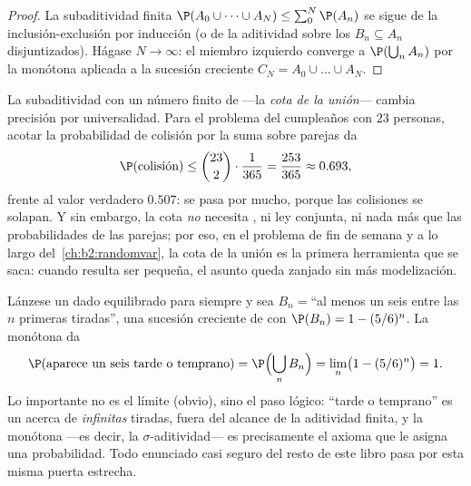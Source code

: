 \begin{proof}
La subaditividad finita $\P(A_0 \cup \dots \cup A_N) \leq \sum_0^N
\P(A_n)$ se sigue de la inclusión-exclusión por inducción (o de la
aditividad sobre los $B_n \subseteq A_n$ disjuntizados). Hágase $N
\to \infty$: el miembro izquierdo converge a $\P(\bigcup_n A_n)$ por
la  monótona aplicada a la sucesión creciente $C_N = A_0
\cup \dots \cup A_N$.
\end{proof}

\begin{example}\label{ex:b2:proba:unionbound}
La subaditividad con un número finito de  ---la \emph{cota de
la unión}--- cambia precisión por universalidad. Para el problema del
cumpleaños con $23$ personas, acotar la probabilidad de colisión por
la suma sobre parejas da
\[
\P(\text{colisión}) \leq \binom{23}2\cdot\frac1{365}
= \frac{253}{365} \approx 0.693 ,
\]
frente al valor verdadero $0.507$: se pasa por mucho, porque las
colisiones se solapan. Y sin embargo, la cota \emph{no} necesita
, ni ley conjunta, ni nada más que las probabilidades
de las parejas; por eso, en el problema de fin de semana y a lo largo
del~\cref{ch:b2:randomvar}, la cota de la unión es la primera
herramienta que se saca: cuando resulta ser pequeña, el asunto queda
zanjado sin más modelización.
\end{example}

\begin{example}\label{ex:b2:proba:sixeventually}
Lánzese un dado equilibrado para siempre y sea $B_n = {}$``al menos
un seis entre las $n$ primeras tiradas'', una sucesión creciente de
 con $\P(B_n) = 1 - (5/6)^n$. La  monótona da
\[
\P(\text{aparece un seis tarde o temprano})
= \P\Bigl(\bigcup_nB_n\Bigr)
= \lim_n\bigl(1 - (5/6)^n\bigr) = 1 .
\]
Lo importante no es el límite (obvio), sino el paso lógico: ``tarde o
temprano'' es un  acerca de \emph{infinitas} tiradas, fuera del
alcance de la aditividad finita, y la  monótona ---es
decir, la $\sigma$-aditividad--- es precisamente el axioma que le
asigna una probabilidad. Todo enunciado casi seguro del resto de este
libro pasa por esta misma puerta estrecha.
\end{example}

